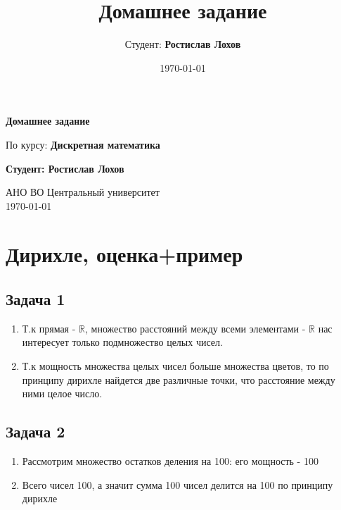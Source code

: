 \documentclass[a4paper,12pt]{article}
\title{Домашнее задание}
\author{Студент: \textbf{Ростислав Лохов}}
\date{\today}
\begin{document}
\begin{titlepage}
    \centering
    \vspace*{1cm}

    \Huge
    \textbf{Домашнее задание}

    \vspace{0.5cm}
    \LARGE
    По курсу: \textbf{Дискретная математика}

    \vspace{1.5cm}

    \textbf{Студент: Ростислав Лохов}

    \vfill

    \Large
    АНО ВО Центральный университет\\
    \vspace{0.3cm}
    \today

\end{titlepage}

\tableofcontents
\newpage

\section{Дирихле, оценка+пример}


\subsection{Задача 1}
\begin{enumerate}
    \item Т.к прямая - $\mathbb{R}$, множество расстояний между всеми элементами - $\mathbb{R}$ нас интересует только подмножество целых чисел.
    \item Т.к мощность множества целых чисел больше множества цветов, то по принципу дирихле найдется две различные точки, что расстояние между ними целое число.
\end{enumerate}

\subsection{Задача 2}
\begin{enumerate}
    \item Рассмотрим множество остатков деления на 100: его мощность - 100
    \item Всего чисел 100, а значит сумма 100 чисел делится на 100 по принципу дирихле
\end{enumerate}
\end{document}
